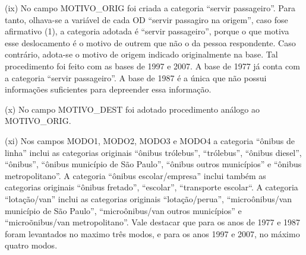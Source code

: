 \begin{compactitem}[]
\item(ix) No campo MOTIVO_ORIG foi criada a categoria ``servir passageiro''. Para tanto, olhava-se a variável de cada OD ``servir passagiro na origem'', caso fose afirmativo (1), a categoria adotada é ``servir passageiro'', porque o que motiva esse deslocamento é o motivo de outrem que não o da pessoa respondente. Caso contrário, adota-se o motivo de origem indicado originalmente na base. Tal procedimento foi feito com as bases de 1997 e 2007. A base de 1977 já conta com a categoria ``servir passageiro''. A base de 1987 é a única que não possui informações suficientes para depreender essa informação.
\item(x) No campo MOTIVO_DEST foi adotado procedimento análogo ao MOTIVO_ORIG.
\item (xi) Nos campos MODO1, MODO2, MODO3 e MODO4 a categoria ``ônibus de linha'' inclui as categorias originais ``ônibus trólebus'', ``trólebus'', ``ônibus diesel'', ``ônibus'', ``ônibus município de São Paulo'', ``ônibus outros municípios'' e ``ônibus metropolitano''. A categoria ``ônibus escolar/empresa'' inclui também as categorias originais ``ônibus fretado'', ``escolar'', ``transporte escolar``. A categoria ``lotação/van'' inclui as categorias originais ``lotação/perua'', ``microônibus/van município de São Paulo'', ``microônibus/van outros municípios'' e ``microõnibus/van metropolitano''. Vale destacar que para os anos de 1977 e 1987 foram levantados no maximo três modos, e para os anos 1997 e 2007, no máximo quatro modos.
\end{compactitem}

\clearpage
\newcommand{\layoutTamColA}{0.50cm}
\newcommand{\layoutTamColB}{3.20cm}
\newcommand{\layoutTamColC}{4.20cm}
\newcommand{\layoutTamColD}{0.90cm}
\newcommand{\layoutTamColE}{4.50cm}
\newcommand{\layoutColA}[2]{%
	\multicolumn{1}{|c|}{\multirow{#1}{\layoutTamColA}{\centering#2}}%
}
\newcommand{\layoutColB}[2]{\multicolumn{1}{c|}{\multirow{#1}{\layoutTamColB}{\centering#2}}}
\newcommand{\layoutColC}[2]{\multicolumn{1}{c|}{\multirow{#1}{\layoutTamColC}{\centering#2}}}
\newcommand{\layoutColD}[2]{\multicolumn{1}{c|}{\multirow{#1}{\layoutTamColD}{\centering#2}}}

